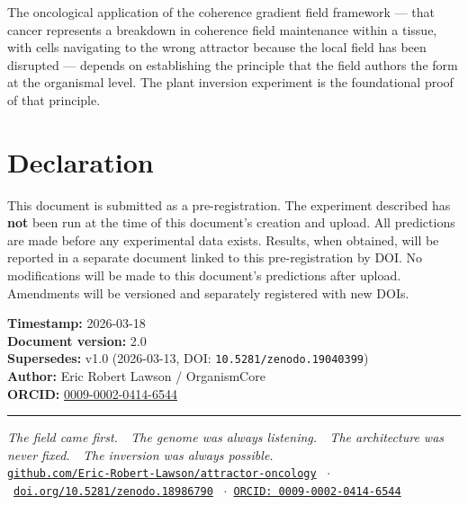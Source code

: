 \documentclass[10pt, a4paper]{article}
\begin{document}
The oncological application of the coherence gradient
field framework --- that cancer represents a breakdown
in coherence field maintenance within a tissue, with
cells navigating to the wrong attractor because the
local field has been disrupted --- depends on establishing
the principle that the field authors the form at the
organismal level.
The plant inversion experiment is the foundational
proof of that principle.

\vspace{0.5em}

\section{Declaration}

This document is submitted as a pre-registration.
The experiment described has \textbf{not} been run
at the time of this document's creation and upload.
All predictions are made before any experimental
data exists.
Results, when obtained, will be reported in a
separate document linked to this pre-registration
by DOI.
No modifications will be made to this document's
predictions after upload.
Amendments will be versioned and separately registered
with new DOIs.

\vspace{0.3em}
\textbf{Timestamp:} 2026-03-18\\
\textbf{Document version:} 2.0\\
\textbf{Supersedes:} v1.0 (2026-03-13,
DOI: \texttt{10.5281/zenodo.19040399})\\
\textbf{Author:} Eric Robert Lawson / OrganismCore\\
\textbf{ORCID:}
\href{https://orcid.org/0009-0002-0414-6544}
{0009-0002-0414-6544}

\vspace{1em}
\noindent\textcolor{rulecolor}{\rule{\linewidth}{0.6pt}}
\begin{center}
\footnotesize
\textit{The field came first.\ \
The genome was always listening.\ \
The architecture was never fixed.\ \
The inversion was always possible.}\\[0.3em]
\href{https://github.com/Eric-Robert-Lawson/attractor-oncology}
{\texttt{github.com/Eric-Robert-Lawson/attractor-oncology}}
\ $\cdot$\
\href{https://doi.org/10.5281/zenodo.18986790}
{\texttt{doi.org/10.5281/zenodo.18986790}}
\ $\cdot$\
\href{https://orcid.org/0009-0002-0414-6544}
{\texttt{ORCID: 0009-0002-0414-6544}}
\end{center}
\end{document}
